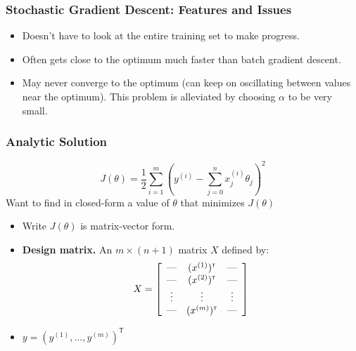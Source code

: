 \documentclass[xcolor=table]{beamer}
\newcommand{\trans}[1]{\ensuremath{#1}^{\scriptscriptstyle{\textsf{T}}}}
\begin{document}
\begin{frame}[t]
\frametitle{Stochastic Gradient Descent: Features and Issues}
\begin{itemize}
    \item Doesn't have to look at the entire training set to make progress.

    \item Often gets close to the optimum much faster than batch gradient descent.

    \item May never converge to the optimum (can keep on oscillating between values 
    near the optimum). This problem is alleviated by choosing $\alpha$ to be very
    small.
\end{itemize}
\end{frame}

\begin{frame}[t]
\frametitle{Analytic Solution}
\[J(\theta) = 
    \frac{1}{2} \sum_{i = 1}^{m} \left (y^{(i)} - \sum_{j = 0}^{n} x^{(i)}_j \theta_j \right )^2\]  
Want to find in closed-form a value of $\theta$ that minimizes $J(\theta)$ 

\begin{itemize}
    \item Write $J(\theta)$ is matrix-vector form.
    
    \pause

    \item \textbf{Design matrix.} An $m \times (n + 1)$ matrix $X$ defined by:
    \[
        X = \left [ \begin{array}{ccc}
                        \hbox{---} & \trans{(x^{(1)})} & \hbox{---} \\
                        \hbox{---} & \trans{(x^{(2)})} & \hbox{---} \\
                        \vdots     & \vdots                   & \vdots     \\
                        \hbox{---} & \trans{(x^{(m)})} & \hbox{---} \\
                   \end{array}
            \right ]
    \]

    \pause

    \item $y = \trans{(y^{(1)}, \ldots, y^{(m)})}$
\end{itemize}
\end{frame}
\end{document}
